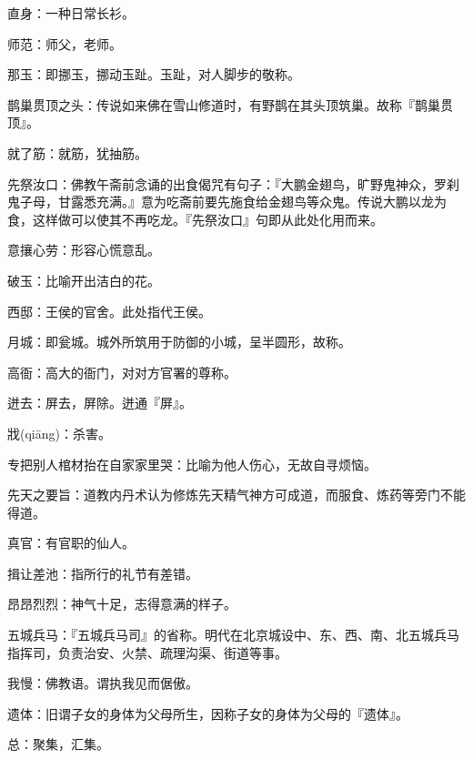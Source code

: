 \startbuffer[2094]
直身：一种日常长衫。
\stopbuffer


\startbuffer[2095]
师范：师父，老师。
\stopbuffer


\startbuffer[2096]
那玉：即挪玉，挪动玉趾。玉趾，对人脚步的敬称。
\stopbuffer


\startbuffer[2097]
鹊巢贯顶之头：传说如来佛在雪山修道时，有野鹊在其头顶筑巢。故称『鹊巢贯顶』。
\stopbuffer


\startbuffer[2098]
就了筋：就筋，犹抽筋。
\stopbuffer


\startbuffer[2099]
先祭汝口：佛教午斋前念诵的出食偈咒有句子：『大鹏金翅鸟，旷野鬼神众，罗刹鬼子母，甘露悉充满。』意为吃斋前要先施食给金翅鸟等众鬼。传说大鹏以龙为食，这样做可以使其不再吃龙。『先祭汝口』句即从此处化用而来。
\stopbuffer


\startbuffer[2100]
意攘心劳：形容心慌意乱。
\stopbuffer


\startbuffer[2101]
破玉：比喻开出洁白的花。
\stopbuffer


\startbuffer[2102]
西邸：王侯的官舍。此处指代王侯。
\stopbuffer


\startbuffer[2103]
月城：即瓮城。城外所筑用于防御的小城，呈半圆形，故称。
\stopbuffer


\startbuffer[2104]
高衙：高大的衙门，对对方官署的尊称。
\stopbuffer


\startbuffer[2105]
迸去：屏去，屏除。迸通『屏』。
\stopbuffer


\startbuffer[2106]
戕(qiāng)：杀害。
\stopbuffer


\startbuffer[2107]
专把别人棺材抬在自家家里哭：比喻为他人伤心，无故自寻烦恼。
\stopbuffer


\startbuffer[2108]
先天之要旨：道教内丹术认为修炼先天精气神方可成道，而服食、炼药等旁门不能得道。
\stopbuffer


\startbuffer[2109]
真官：有官职的仙人。
\stopbuffer


\startbuffer[2110]
揖让差池：指所行的礼节有差错。
\stopbuffer


\startbuffer[2111]
昂昂烈烈：神气十足，志得意满的样子。
\stopbuffer


\startbuffer[2112]
五城兵马：『五城兵马司』的省称。明代在北京城设中、东、西、南、北五城兵马指挥司，负责治安、火禁、疏理沟渠、街道等事。
\stopbuffer


\startbuffer[2113]
我慢：佛教语。谓执我见而倨傲。
\stopbuffer


\startbuffer[2114]
遗体：旧谓子女的身体为父母所生，因称子女的身体为父母的『遗体』。
\stopbuffer


\startbuffer[2115]
总：聚集，汇集。
\stopbuffer


